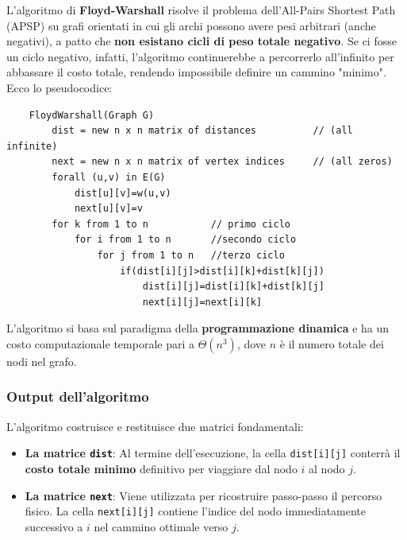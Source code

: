 L'algoritmo di \textbf{Floyd-Warshall} risolve il problema dell'All-Pairs Shortest Path (APSP) su grafi orientati in cui gli archi possono avere pesi arbitrari (anche negativi), 
a patto che \textbf{non esistano cicli di peso totale negativo}. Se ci fosse un ciclo negativo, infatti, 
l'algoritmo continuerebbe a percorrerlo all'infinito per abbassare il costo totale, rendendo impossibile definire un cammino "minimo". Ecco lo pseudocodice:\smallskip\\
\begin{verbatim}
    FloydWarshall(Graph G)
        dist = new n x n matrix of distances          // (all infinite)
        next = new n x n matrix of vertex indices     // (all zeros)
        forall (u,v) in E(G)
            dist[u][v]=w(u,v)
            next[u][v]=v
        for k from 1 to n           // primo ciclo
            for i from 1 to n       //secondo ciclo 
                for j from 1 to n   //terzo ciclo
                    if(dist[i][j]>dist[i][k]+dist[k][j])        
                        dist[i][j]=dist[i][k]+dist[k][j]
                        next[i][j]=next[i][k]
\end{verbatim}

\noindent L'algoritmo si basa sul paradigma della \textbf{programmazione dinamica} e ha un costo computazionale temporale pari a $\Theta(n^3)$, dove $n$ è il numero totale dei nodi nel grafo.

\subsubsection*{Output dell'algoritmo}
L'algoritmo costruisce e restituisce due matrici fondamentali:
\begin{itemize}
    \item \textbf{La matrice \texttt{dist}}: Al termine dell'esecuzione, la cella \texttt{dist[i][j]} conterrà il \textbf{costo totale minimo} definitivo per viaggiare dal nodo $i$ al nodo $j$.
    \item \textbf{La matrice \texttt{next}}: Viene utilizzata per ricostruire passo-passo il percorso fisico. La cella \texttt{next[i][j]} contiene l'indice del nodo immediatamente successivo a 
    $i$ nel cammino ottimale verso $j$.
\end{itemize}


